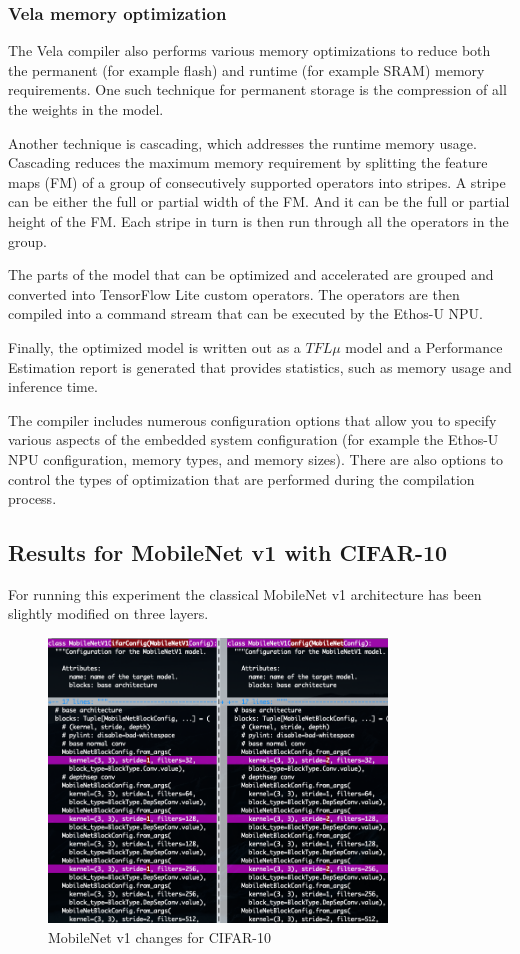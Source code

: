 \subsubsection{Vela memory optimization}\label{subsub:vela_memory_optimization}
The Vela compiler also performs various memory optimizations to reduce both the
permanent (for example flash) and runtime (for example SRAM) memory
requirements.
One such technique for permanent storage is the compression of all the weights
in the model.

Another technique is cascading, which addresses the runtime memory usage.
Cascading reduces the maximum memory requirement by splitting the feature maps
(FM) of a group of consecutively supported operators into stripes. A stripe can
be either the full or partial width of the FM\@. And it can be the full or
partial height of the FM\@. Each stripe in turn is then run through all the
operators in the group.

The parts of the model that can be optimized and accelerated are grouped and
converted into TensorFlow Lite custom operators. The operators are then
compiled into a command stream that can be executed by the Ethos-U NPU\@.

Finally, the optimized model is written out as a $TFL\mu$ model and a
Performance Estimation report is generated that provides statistics, such as
memory usage and inference time.

The compiler includes numerous configuration options that allow you to specify
various aspects of the embedded system configuration (for example the Ethos-U
NPU configuration, memory types, and memory sizes). There are also options to
control the types of optimization that are performed during the compilation
process.\cite{vela_compiler}

\subsection{Results for MobileNet v1 with CIFAR-10}
For running this experiment the classical MobileNet v1 architecture has been
slightly modified on three layers.

\begin{figure}[ht]
    \includegraphics[width=9cm]{images/experiments/mobilenet_cifar10_diff.png}
    \centering
    \caption{MobileNet v1 changes for CIFAR-10}\label{fig:mobilenet_cifar10_diff}
\end{figure}

